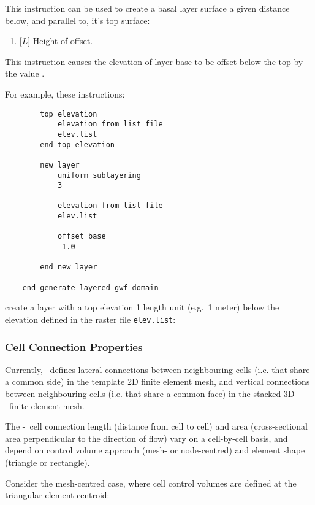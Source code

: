 {This instruction can be used to create a basal layer surface a given distance below, and parallel to, it's top surface:

    {\squish
    \begin{enumerate}
        \item {} [$L$] Height of offset.
    \end{enumerate}
    This instruction causes the elevation of layer base to be offset below the  top by the  value .
}

\pagebreak    
For example, these instructions:
\begin{verbatim}
        top elevation
            elevation from list file
            elev.list
        end top elevation

        new layer
            uniform sublayering
            3

            elevation from list file
            elev.list

            offset base
            -1.0

        end new layer

    end generate layered gwf domain
\end{verbatim}
 create a layer with a top elevation 1 length unit (e.g.\ 1 meter) below the elevation defined in the raster file \texttt{elev.list}:


\subsubsection{Cell Connection Properties}
\label{section:GWFCellConnections}

Currently, \mut\ defines lateral connections between neighbouring cells (i.e. that share a common side) in the template 2D finite element mesh, and vertical connections between neighbouring cells (i.e. that share a common face) in the stacked 3D \gwf\ finite-element mesh.

The \gwf-\gwf\ cell connection length (distance from cell to cell) and area (cross-sectional area perpendicular to the direction of flow) vary on a cell-by-cell basis, and depend on control volume approach (mesh- or node-centred) and element shape (triangle or rectangle).

Consider the mesh-centred case, where cell control volumes are defined at the triangular element centroid:

}
